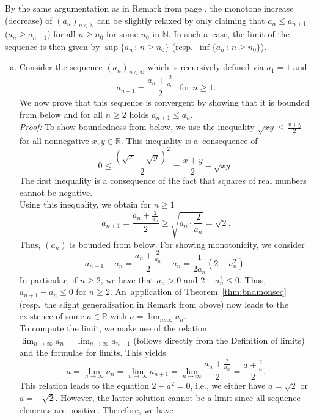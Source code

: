 \begin{Definition}[Monotonicity]
\begin{Remark}{}\label{rem:monseqgen}
    By the same argumentation as in Remark from page \pageref{rem:n_0mon}, the monotone increase (decrease) of $(a_n)_{n\in\mathbb{N}}$ can be slightly relaxed by only claiming that $a_n\leq a_{n+1}$ ($a_n\geq a_{n+1}$) for all $n\geq n_0$ for some $n_0$ in $\mathbb{N}$. In such a~case, the limit of the sequence is then given by $\sup\{a_n\,:\,n\geq n_0\}$ (resp.\ $\inf\{a_n\,:\,n\geq n_0\}$).
\end{Remark}

\begin{example}{}\label{ex:monseqconv}
 \begin{enumerate}[a)]
  \item Consider the sequence $(a_n)_{n\in\mathbb{N}}$ which is recursively defined via $a_1=1$ and 
  \[a_{n+1}=\frac{a_n+\frac2{a_n}}{2}\;\text{  for $n\geq 1$.}\] 
  We now prove that this sequence is convergent by showing that
it is bounded from below and for all $n\geq2$ holds $a_{n+1}\leq a_n$.\\[2ex]
{\em Proof:} To show boundedness from below, we use the inequality $\sqrt{xy}\leq\frac{x+y}2$ for all nonnegative $x,y\in\mathbb{R}$. This inequality is a~consequence of
\[0\leq\frac{(\sqrt{x}-\sqrt{y})^2}2=\frac{x+y}2-\sqrt{xy}.\]
The first inequality is a consequence of the fact that squares of real numbers cannot be negative.\\
Using this inequality, we obtain for $n\geq1$
\[a_{n+1}=\frac{a_n+\frac{2}{a_n}}{2}\geq \sqrt{a_n\cdot\frac2{a_n}}=\sqrt{2}.\]
Thus, $(a_n)$ is bounded from below. For showing monotonicity, we consider
\[a_{n+1}-a_n=\frac{a_n+\frac2{a_n}}{2}-a_n=\frac{1}{2a_n}(2-a_n^2).\]
In particular, if $n\geq2$, we have that $a_n>0$ and $2-a_n^2\leq0$. Thus, $a_{n+1}-a_n\leq0$ for $n\geq2$. An~application of Theorem~\ref{thm:bndmonseq} (resp.\ the slight generalisation in Remark %
from above) 
now leads to the existence of some $a\in\mathbb{R}$ with $a=\lim_{n	o\infty}a_n$.\\[2ex]
To compute the limit, we make use of the relation $\lim_{n \to\infty}a_n=\lim_{n\to\infty}a_{n+1}$ (follows directly from the Definition of limits) and the formulae for limits. This yields
\[a=\lim_{n \to\infty}a_n=\lim_{n\to\infty}a_{n+1}=\lim_{n\to\infty}\frac{a_n+\frac2{a_n}}{2}=\frac{a+\frac2{a}}{2}.\]
This relation leads to the equation $2-a^2=0$, i.e., we either have $a=\sqrt{2}$ or $a=-\sqrt{2}$. However, the latter solution cannot be a limit since all sequence elements are positive. Therefore, we have

\end{enumerate}
\end{example}
\end{Definition}
